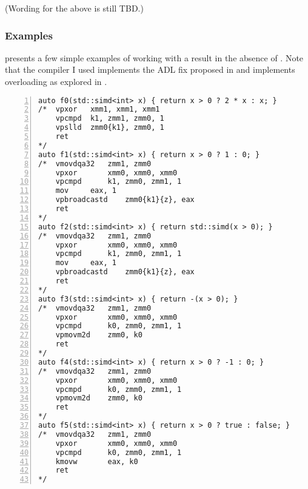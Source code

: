 (Wording for the above is still TBD.)

\subsubsection{Examples}

 presents a few simple examples of working with a
 result in the absence of .
Note that the compiler I used implements the ADL fix proposed in \cite{P2600R0}
and implements  overloading as explored in \cite{D0917}.

\begin{lstlisting}[numbers=left,float={hbtp},label=lst:simdconditionals,caption={
    \code{simd} conditionals without \code{where} and with \cite{P2600R0} and \cite{D0917}, showing the corresponding assembly output (\code{gcc -O2 -std=c++23 -march=skylake-avx512}; personal GCC 12.1 branch with patches implementing \cite{P2600R0} and \cite{D0917})
}]
auto f0(std::simd<int> x) { return x > 0 ? 2 * x : x; }
/*	vpxor	xmm1, xmm1, xmm1
	vpcmpd	k1, zmm1, zmm0, 1
	vpslld	zmm0{k1}, zmm0, 1
	ret
*/
auto f1(std::simd<int> x) { return x > 0 ? 1 : 0; }
/*	vmovdqa32	zmm1, zmm0
	vpxor		xmm0, xmm0, xmm0
	vpcmpd		k1, zmm0, zmm1, 1
	mov		eax, 1
	vpbroadcastd	zmm0{k1}{z}, eax
	ret
*/
auto f2(std::simd<int> x) { return std::simd(x > 0); }
/*	vmovdqa32	zmm1, zmm0
	vpxor		xmm0, xmm0, xmm0
	vpcmpd		k1, zmm0, zmm1, 1
	mov		eax, 1
	vpbroadcastd	zmm0{k1}{z}, eax
	ret
*/
auto f3(std::simd<int> x) { return -(x > 0); }
/*	vmovdqa32	zmm1, zmm0
	vpxor		xmm0, xmm0, xmm0
	vpcmpd		k0, zmm0, zmm1, 1
	vpmovm2d	zmm0, k0
	ret
*/
auto f4(std::simd<int> x) { return x > 0 ? -1 : 0; }
/*	vmovdqa32	zmm1, zmm0
	vpxor		xmm0, xmm0, xmm0
	vpcmpd		k0, zmm0, zmm1, 1
	vpmovm2d	zmm0, k0
	ret
*/
auto f5(std::simd<int> x) { return x > 0 ? true : false; }
/*	vmovdqa32	zmm1, zmm0
	vpxor		xmm0, xmm0, xmm0
	vpcmpd		k0, zmm0, zmm1, 1
	kmovw		eax, k0
	ret
*/
\end{lstlisting}

